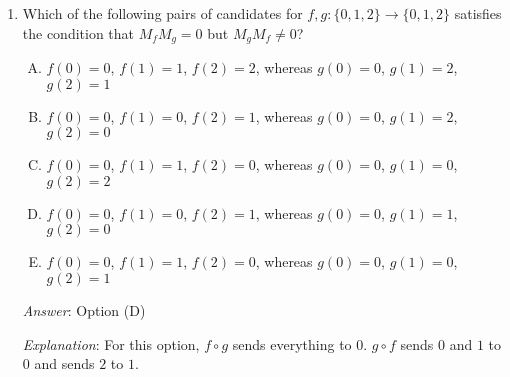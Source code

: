 \documentclass[10pt]{amsart}
\begin{document}
\begin{enumerate}
  \begin{enumerate}[(A)]
  \item $M_f$ must be the identity matrix.
  \item $M_f$ must be the zero matrix.
  \item $M_f$ must be an idempotent matrix.
  \item $M_f$ must be a nilpotent matrix.
  \item $M_f$ must be a permutation matrix.
  \end{enumerate}

  {\em Answer}: Option (C)

  {\em Explanation}: The function $f$ given here satisfies the
  condition that $f(f(i)) = f(i)$ for all $i$. To see this, note that:

  \begin{itemize}
  \item if $f(i) = i$, then $f(f(i)) = f(i) = i$, i.e., we stay looped at $i$.
  \item if $f(i) = 0$, then $f(f(i)) = f(0) = 0$, i.e., once we reach
    $0$, we stay there.
  \end{itemize}

  {\em Performance review}: 10 out of 28 got this. 9 chose (D), 7
  chose (E), 2 chose (A).

  {\em Historical note (last time)}: $12$ out of $26$ got this. $6$ chose (D),
  $5$ chose (E), $3$ chose (A).
\item Which of the following pairs of candidates for $f,g: \{ 0,1,2 \}
  \to \{ 0,1,2 \}$ satisfies the condition that $M_fM_g = 0$ but
  $M_gM_f \ne 0$? 

  \begin{enumerate}[(A)]
  \item $f(0) = 0$, $f(1) = 1$, $f(2) = 2$, whereas $g(0) = 0$, $g(1)
    = 2$, $g(2) = 1$
  \item $f(0) = 0$, $f(1) = 0$, $f(2) = 1$, whereas $g(0) = 0$, $g(1)
    = 2$, $g(2) = 0$
  \item $f(0) = 0$, $f(1) = 1$, $f(2) = 0$, whereas $g(0) = 0$, $g(1)
    = 0$, $g(2) = 2$
  \item $f(0) = 0$, $f(1) = 0$, $f(2) = 1$, whereas $g(0) = 0$, $g(1)
    = 1$, $g(2) = 0$
  \item $f(0) = 0$, $f(1) = 1$, $f(2) = 0$, whereas $g(0) = 0$, $g(1)
    = 0$, $g(2) = 1$
  \end{enumerate}

  {\em Answer}: Option (D)

  {\em Explanation}: For this option, $f \circ g$ sends everything to
  $0$. $g \circ f$ sends $0$ and $1$ to $0$ and sends $2$ to $1$.


\end{enumerate}
\end{document}
